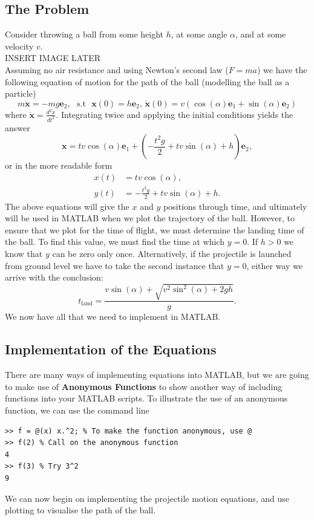 \documentclass[12pt]{report}
\def\*#1{\mathbf{#1}}
\begin{document}
\subsection*{The Problem}
Consider throwing a ball from some height $h$, at some angle $\alpha$, and at some velocity $v$.\\
INSERT IMAGE LATER\\
Assuming no air resistance and using Newton's second law ($F=ma$) we have the following equation of motion for the path of the ball (modelling the ball as a particle)
\begin{equation*}
m\ddot{\*x} = -mg\*e_2,\,\, \text{ s.t }\,\, \*x(0) = h\*e_2, \, \dot{\*x}(0) = v\left(\cos(\alpha)\*e_1+\sin(\alpha)\*e_2\right)
\end{equation*} 
where $\displaystyle \ddot{\*x} = \frac{d^2x}{dt^2}$. Integrating twice and applying the initial conditions yields the answer
\begin{equation*}
\*x = tv\cos(\alpha)\*e_1+\left(-\frac{t^2 g}{2}+tv\sin(\alpha)+h\right)\*e_2,
\end{equation*}
or in the more readable form
\begin{align}
x(t) &= tv\cos(\alpha),\label{EqMot1}\\
y(t) &= -\frac{t^2 g}{2}+tv\sin(\alpha)+h.\label{EqMot2}
\end{align}
The above equations will give the $x$ and $y$ positions through time, and ultimately will be used in MATLAB when we plot the trajectory of the ball. However, to ensure that we plot for the time of flight, we must determine the landing time of the ball. To find this value, we must find the time at which $y = 0$. If $h>0$ we know that $y$ can be zero only once. Alternatively, if the projectile is launched from ground level we have to take the second instance that $y=0$, either way we arrive with the conclusion:
\begin{equation}\label{TimeLand}
t_{\text{land}} = \frac{v\sin(\alpha)+\sqrt{v^2\sin^2(\alpha)+2gh}}{g}.
\end{equation}
We now have all that we need to implement in MATLAB.
\subsection*{Implementation of the Equations}
There are many ways of implementing equations into MATLAB, but we are going to make use of \textbf{Anonymous Functions} to show another way of including functions into your MATLAB scripts. To illustrate the use of an anonymous function, we can use the command line
\begin{lstlisting}
>> f = @(x) x.^2; % To make the function anonymous, use @
>> f(2) % Call on the anonymous function
4
>> f(3) % Try 3^2
9
\end{lstlisting}
We can now begin on implementing the projectile motion equations, and use plotting to visualise the path of the ball.\\
 
\end{document}
